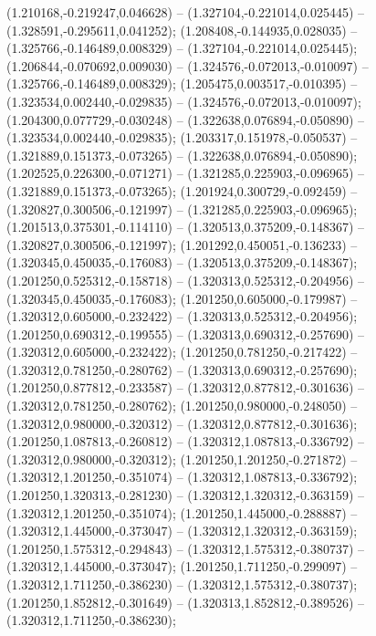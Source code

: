  (1.210168,-0.219247,0.046628) -- (1.327104,-0.221014,0.025445) -- (1.328591,-0.295611,0.041252);
 (1.208408,-0.144935,0.028035) -- (1.325766,-0.146489,0.008329) -- (1.327104,-0.221014,0.025445);
 (1.206844,-0.070692,0.009030) -- (1.324576,-0.072013,-0.010097) -- (1.325766,-0.146489,0.008329);
 (1.205475,0.003517,-0.010395) -- (1.323534,0.002440,-0.029835) -- (1.324576,-0.072013,-0.010097);
 (1.204300,0.077729,-0.030248) -- (1.322638,0.076894,-0.050890) -- (1.323534,0.002440,-0.029835);
 (1.203317,0.151978,-0.050537) -- (1.321889,0.151373,-0.073265) -- (1.322638,0.076894,-0.050890);
 (1.202525,0.226300,-0.071271) -- (1.321285,0.225903,-0.096965) -- (1.321889,0.151373,-0.073265);
 (1.201924,0.300729,-0.092459) -- (1.320827,0.300506,-0.121997) -- (1.321285,0.225903,-0.096965);
 (1.201513,0.375301,-0.114110) -- (1.320513,0.375209,-0.148367) -- (1.320827,0.300506,-0.121997);
 (1.201292,0.450051,-0.136233) -- (1.320345,0.450035,-0.176083) -- (1.320513,0.375209,-0.148367);
 (1.201250,0.525312,-0.158718) -- (1.320313,0.525312,-0.204956) -- (1.320345,0.450035,-0.176083);
 (1.201250,0.605000,-0.179987) -- (1.320312,0.605000,-0.232422) -- (1.320313,0.525312,-0.204956);
 (1.201250,0.690312,-0.199555) -- (1.320313,0.690312,-0.257690) -- (1.320312,0.605000,-0.232422);
 (1.201250,0.781250,-0.217422) -- (1.320312,0.781250,-0.280762) -- (1.320313,0.690312,-0.257690);
 (1.201250,0.877812,-0.233587) -- (1.320312,0.877812,-0.301636) -- (1.320312,0.781250,-0.280762);
 (1.201250,0.980000,-0.248050) -- (1.320312,0.980000,-0.320312) -- (1.320312,0.877812,-0.301636);
 (1.201250,1.087813,-0.260812) -- (1.320312,1.087813,-0.336792) -- (1.320312,0.980000,-0.320312);
 (1.201250,1.201250,-0.271872) -- (1.320312,1.201250,-0.351074) -- (1.320312,1.087813,-0.336792);
 (1.201250,1.320313,-0.281230) -- (1.320312,1.320312,-0.363159) -- (1.320312,1.201250,-0.351074);
 (1.201250,1.445000,-0.288887) -- (1.320312,1.445000,-0.373047) -- (1.320312,1.320312,-0.363159);
 (1.201250,1.575312,-0.294843) -- (1.320312,1.575312,-0.380737) -- (1.320312,1.445000,-0.373047);
 (1.201250,1.711250,-0.299097) -- (1.320312,1.711250,-0.386230) -- (1.320312,1.575312,-0.380737);
 (1.201250,1.852812,-0.301649) -- (1.320313,1.852812,-0.389526) -- (1.320312,1.711250,-0.386230);
